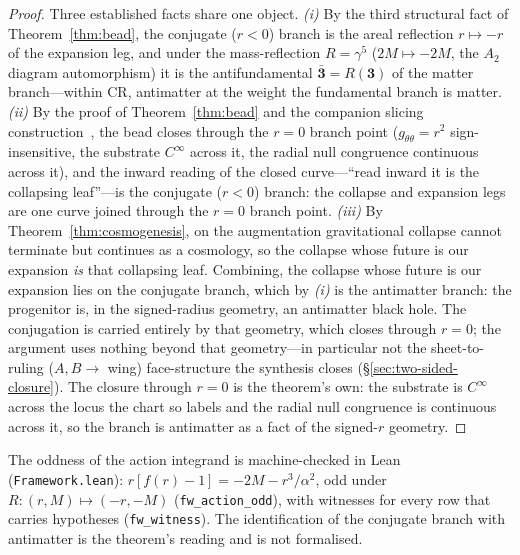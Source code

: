 \documentclass[11pt,a4paper]{article}
\theoremstyle{plain}
\theoremstyle{definition}
\theoremstyle{remark}
\begin{document}
\begin{proof}
Three established facts share one object. \emph{(i)} By the third structural fact of Theorem~\ref{thm:bead}, the conjugate ($r<0$) branch is the areal reflection $r\mapsto-r$ of the expansion leg, and under the mass-reflection $R=\gamma^5$ ($2M\mapsto-2M$, the $A_2$ diagram automorphism) it is the antifundamental $\bar{\mathbf 3}=R(\mathbf 3)$ of the matter branch---within CR, antimatter at the weight the fundamental branch is matter. \emph{(ii)} By the proof of Theorem~\ref{thm:bead} and the companion slicing construction~\cite{JanzenSlicing}, the bead closes through the $r=0$ branch point ($g_{\theta\theta}=r^2$ sign-insensitive, the substrate $C^\infty$ across it, the radial null congruence continuous across it), and the inward reading of the closed curve---``read inward it is the collapsing leaf''---is the conjugate ($r<0$) branch: the collapse and expansion legs are one curve joined through the $r=0$ branch point. \emph{(iii)} By Theorem~\ref{thm:cosmogenesis}, on the augmentation gravitational collapse cannot terminate but continues as a cosmology, so the collapse whose future is our expansion \emph{is} that collapsing leaf. Combining, the collapse whose future is our expansion lies on the conjugate branch, which by \emph{(i)} is the antimatter branch: the progenitor is, in the signed-radius geometry, an antimatter black hole. The conjugation is carried entirely by that geometry, which closes through $r=0$; the argument uses nothing beyond that geometry---in particular not the sheet-to-ruling ($A,B\to$ wing) face-structure the synthesis closes (\S\ref{sec:two-sided-closure}). The closure through $r=0$ is the theorem's own: the substrate is $C^\infty$ across the locus the chart so labels and the radial null congruence is continuous across it, so the branch is antimatter as a fact of the signed-$r$ geometry.
\end{proof}

\noindent The oddness of the action integrand is machine-checked in Lean (\texttt{Framework.lean}): $r[f(r)-1]=-2M-r^{3}/\alpha^{2}$, odd under $R:(r,M)\mapsto(-r,-M)$ (\texttt{fw\_action\_odd}), with witnesses for every row that carries hypotheses (\texttt{fw\_witness}). The identification of the conjugate branch with antimatter is the theorem's reading and is not formalised.
\end{document}
